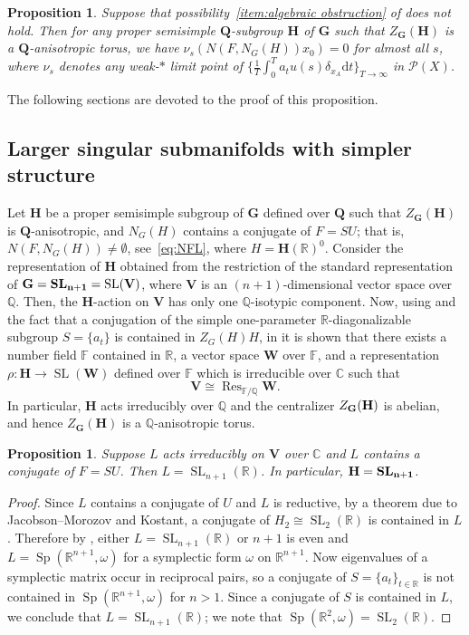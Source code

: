 \documentclass[12pt,reqno]{amsart}
\newcommand{\Sp}{\operatorname{Sp}}
\newcommand{\SL}{\operatorname{SL}}
\numberwithin{equation}{section}
\theoremstyle{plain}
\newtheorem{prop}[thm]{Proposition}
\theoremstyle{definition}
\theoremstyle{remark}
\newcommand\bfG{\mathbf{G}}
\newcommand\bfH{\mathbf{H}}
\newcommand\bfQ{\mathbf{Q}}
\newcommand\bfV{\mathbf{V}}
\newcommand\bfW{\mathbf{W}}
\newcommand\bbF{\mathbb{F}}
\newcommand\bbQ{\mathbb{Q}}
\newcommand\cP{\mathcal{P}}
\newcommand{\R}{\mathbb{R}}
\newcommand{\C}{\mathbb{C}}
\newcommand{\Q}{\mathbb{Q}}
\newcommand{\de}{\mathrm{d}}
\DeclareMathOperator{\Res}{Res}
\begin{document}
\begin{prop}  \label{prop:goal}
Suppose that possibility~\ref{item:algebraic obstruction} of  does not hold. Then for any proper semisimple $\bfQ$-subgroup $\bfH$ of $\bfG$ such that $Z_\bfG(\bfH)$ is a $\bfQ$-anisotropic torus, we have $\nu_s(N(F,N_G(H))x_0)=0$ for almost all $s$, where $\nu_s$ denotes any weak-$\ast$ limit point of $\{\frac{1}{T}\int_{0}^{T}a_tu(s)\delta_{x_A}\de t\}_{T\to\infty}$ in $\cP(X)$. 
\end{prop}

The following sections are devoted to the proof of this proposition. 

\subsection{Larger singular submanifolds with simpler structure} 
\label{subsec:SingSet}
Let $\bfH$ be a proper semisimple subgroup of $\bfG$ defined over $\bfQ$ such that $Z_\bfG(\bfH)$ is $\bfQ$-anisotropic, and $N_G(H)$ contains a conjugate of $F=SU$; that is, $N(F,N_G(H))\neq \emptyset$, see~\eqref{eq:NFL}, where $H=\bfH(\R)^0$. Consider the representation of $\bfH$ obtained from the restriction of the standard representation of $\bfG=\bf{SL}_{n+1}=\SL(\bfV)$, where $\bfV$ is an $(n+1)$-dimensional vector space over $\Q$. 
Then, the $\bfH$-action on $\bfV$ has only one $\Q$-isotypic component. Now, using \cite[Theorem 7.2]{Tits71} and the fact that a conjugation of the simple one-parameter $\R$-diagonalizable subgroup $S=\{a_t\}$ is contained in $Z_G(H)H$, in \cite[Proof of Proposition~2.1]{EinsiedlerShi19} it is shown that there exists a number field $\bbF$ contained in $\R$, a vector space $\bfW$ over $\bbF$, and a representation $\rho:\bfH\to\SL(\bfW)$ defined over $\bbF$ which is irreducible over $\C$ such that 
    \[
    \bfV\cong \Res_{\bbF/\bbQ} \bfW.
    \]
    In particular, $\bfH$ acts irreducibly over $\bbQ$ and the centralizer 
    $Z_{\bfG}(\bf H)$ is abelian, and hence $Z_\bfG(\bfH)$ is a $\Q$-anisotropic torus. 

    \begin{prop} \label{prop:sln} 
        Suppose $L$ acts irreducibly on $\bfV$ over $\C$ and $L$ contains a conjugate of $F=SU$. Then $L=\SL_{n+1}(\R)$. In particular, $\bf H={\bf SL}_{n+1}$.
    \end{prop}

    \begin{proof}
        Since $L$ contains a conjugate of $U$ and $L$ is reductive, by a theorem due to Jacobson--Morozov and Kostant, a conjugate of $H_2\cong\SL_2(\R)$ is contained in $L$. Therefore by \cite[Theorem A.7]{SY24PLMS}, either $L=\SL_{n+1}(\R)$ or $n+1$ is even and $L={\Sp}(\R^{n+1},\omega)$ for a symplectic form $\omega$ on $\R^{n+1}$. Now eigenvalues of a symplectic matrix occur in reciprocal pairs, so a conjugate of $S=\{a_t\}_{t\in\R}$ is not contained in ${\Sp}(\R^{n+1},\omega)$ for $n>1$. Since a conjugate of $S$ is contained in $L$, we conclude that $L= \SL_{n+1}(\R)$; we note that $\Sp(\R^2,\omega)=\SL_2(\R)$.
    \end{proof}
    
\end{document}
